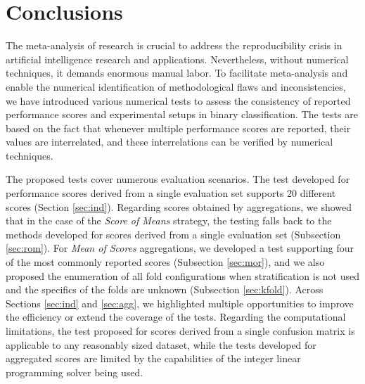 \documentclass[3p, times]{elsarticle}
\begin{document}
\section{Conclusions}
\label{sec:conclusions}

The meta-analysis of research is crucial to address the reproducibility crisis in artificial intelligence research and applications. Nevertheless, without numerical techniques, it demands enormous manual labor. To facilitate meta-analysis and enable the numerical identification of methodological flaws and inconsistencies, we have introduced various numerical tests to assess the consistency of reported performance scores and experimental setups in binary classification. The tests are based on the fact that whenever multiple performance scores are reported, their values are interrelated, and these interrelations can be verified by numerical techniques.

The proposed tests cover numerous evaluation scenarios. The test developed for performance scores derived from a single evaluation set supports 20 different scores (Section \ref{sec:ind}). Regarding scores obtained by aggregations, we showed that in the case of the \emph{Score of Means} strategy, the testing falls back to the methods developed for scores derived from a single evaluation set (Subsection \ref{sec:rom}). For \emph{Mean of Scores} aggregations, we developed a test supporting four of the most commonly reported scores (Subsection \ref{sec:mor}), and we also proposed the enumeration of all fold configurations when stratification is not used and the specifics of the folds are unknown (Subsection \ref{sec:kfold}). Across Sections \ref{sec:ind} and \ref{sec:agg}, we highlighted multiple opportunities to improve the efficiency or extend the coverage of the tests.
Regarding the computational limitations, the test proposed for scores derived from a single confusion matrix is applicable to any reasonably sized dataset, while the tests developed for aggregated scores are limited by the capabilities of the integer linear programming solver being used.
\end{document}
